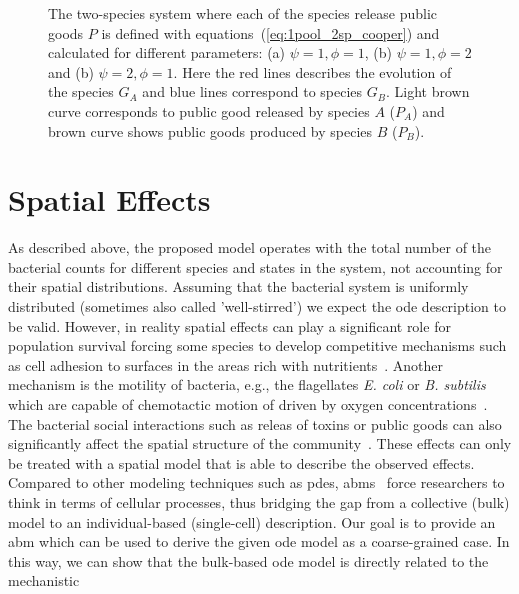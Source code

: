 \documentclass[10pt,twocolumn,5p]{elsarticle}
\numberwithin{equation}{section}
\begin{document}
\begin{figure}
\begin{center}
    \caption{
        The two-species system where each of the species release public goods $P$ is defined with equations~(\ref{eq:1pool_2sp_cooper}) and calculated for different parameters:
        (a) $\psi=1, \phi=1$, (b) $\psi=1, \phi=2$ and (b) $\psi=2, \phi=1$.
        Here the red lines describes the evolution of the species $G_A$ and blue lines correspond to species $G_B$.
        Light brown curve corresponds to public good released by species $A$ ($P_A$) and brown curve shows public goods produced by species $B$ ($P_B$).
    }
    \label{fig:1pool_2sp_cooper}
    \end{center}
\end{figure}

\section{Spatial Effects}
As described above, the proposed model operates with the total number of the bacterial counts for
different species and states in the system, not accounting for their spatial distributions.
Assuming that the bacterial system is uniformly distributed (sometimes also called 'well-stirred')
we expect the \ac{ode} description to be valid.
However, in reality spatial effects can play a significant role for population survival forcing some
species to develop competitive mechanisms such as cell adhesion to surfaces in the areas rich with
nutritients~\cite{htuson_bacteriasurface_2013}.
Another mechanism is the motility of bacteria, e.g., the flagellates \textit{E. coli} or
\textit{B. subtilis} which are capable of chemotactic motion of driven by oxygen
concentrations~\cite{decoene_microscopic_2011}.
The bacterial social interactions such as releas of toxins or public goods can also
significantly affect the spatial structure of the community~\cite{blanchard_bacterial_2015}.
These effects can only be treated with a spatial model that is able to describe the observed
effects.\\
Compared to other modeling techniques such as \acp{pde}, \acp{abm}~\cite{nagarajan_agent-based_2022-1} force researchers to think in
terms of cellular processes, thus bridging the gap from a
collective (bulk) model to an individual-based (single-cell) description.
Our goal is to provide an \ac{abm} which can be used to derive the given \ac{ode} model as a
coarse-grained case.
In this way, we can show that the bulk-based \ac{ode} model is directly related to the mechanistic
\end{document}
